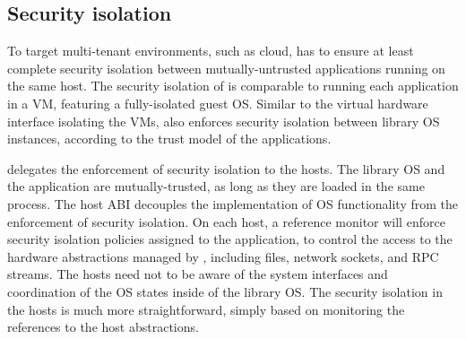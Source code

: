 







\subsection{Security isolation}
\label{sec:overview:host:security}


To target multi-tenant environments, such as cloud,
\graphene{} has to ensure at least complete security isolation between mutually-untrusted applications running on the same host.
The security isolation of \graphene{} is comparable to running each application
in a VM, featuring a fully-isolated guest OS.
Similar to the virtual hardware interface isolating the VMs,
\thehostabi{} also enforces security isolation between library OS instances,
according to the trust model of the applications.



\graphene{} delegates the enforcement of security isolation to the hosts.
The library OS and the application are mutually-trusted, as long as they are loaded in the same process.
The host ABI decouples the implementation of OS functionality
from the enforcement of security isolation.
On each host, a reference monitor will enforce security isolation policies assigned to the application, to control the access to the hardware abstractions managed by \thehostabi{}, including files, network sockets, and RPC streams.
The hosts need not to be aware of the system interfaces and coordination of the OS states
inside of the library OS.
The security isolation in the hosts
is much more straightforward, simply based on monitoring the references
to the host abstractions.





